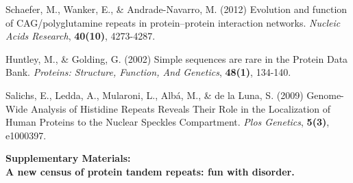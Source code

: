 \documentclass[a4,center,fleqn]{NAR}
\begin{document}
\begin{thebibliography}{4}
Schaefer, M., Wanker, E., \& Andrade-Navarro, M. (2012)
Evolution and function of CAG/polyglutamine repeats in protein–protein interaction networks.
\textit{Nucleic Acids Research}, \textbf{40(10)}, 4273-4287. 

Huntley, M., \& Golding, G. (2002)
Simple sequences are rare in the Protein Data Bank. 
\textit{Proteins: Structure, Function, And Genetics}, \textbf{48(1)}, 134-140. 

Salichs, E., Ledda, A., Mularoni, L., Alb\'a, M., \& de la Luna, S. (2009)
Genome-Wide Analysis of Histidine Repeats Reveals Their Role in the Localization of Human Proteins to the Nuclear Speckles Compartment. 
\textit{Plos Genetics}, \textbf{5(3)}, e1000397. 

\end{thebibliography}

%
%





\clearpage
\onecolumn %
\begin{center}
\textbf{\large Supplementary Materials: \\ A new census of protein tandem repeats: fun with disorder.}
\end{center}
\setcounter{equation}{0}
\setcounter{figure}{0}
\setcounter{table}{0}
\setcounter{page}{1}
\makeatletter
\renewcommand{\theequation}{S\arabic{equation}}
\renewcommand{\thefigure}{S\arabic{figure}}
\renewcommand{\bibnumfmt}[1]{[S#1]}
\end{document}
